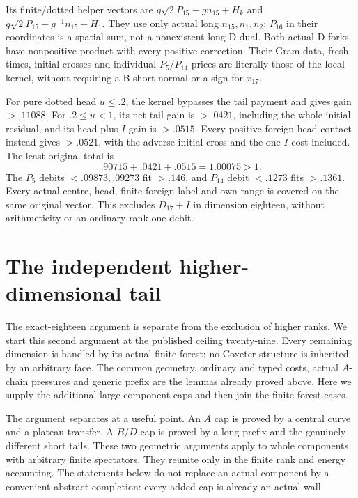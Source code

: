 \documentclass[11pt]{article}
\theoremstyle{definition}
\theoremstyle{remark}
\begin{document}
Its finite/dotted helper vectors are
\(g\sqrt2P_{15}-gn_{15}+H_k\) and
\(g\sqrt2P_{15}-g^{-1}n_{15}+H_1\). They use only actual long
\(n_{15},n_1,n_2\); \(P_{16}\) in their coordinates is a spatial
sum, not a nonexistent long D dual. Both actual D forks have
nonpositive product with every positive correction. Their Gram data,
fresh times, initial crosses and individual \(P_5/P_{14}\) prices
are literally those of the local kernel, without requiring a B short
normal or a sign for \(x_{17}\).

For pure dotted head \(u\le.2\), the kernel bypasses the tail payment
and gives gain \(>.11088\). For \(.2\le u<1\), its net tail gain
is \(>.0421\), including the whole initial residual, and its
head-plus-\(I\) gain is \(>.0515\). Every positive foreign head
contact instead gives \(>.0521\), with the adverse initial cross
and the one \(I\) cost included. The least original total is
\[
                   .90715+.0421+.0515=1.00075>1.
\]
The \(P_5\) debits \(<.09873,.09273\) fit \(>.146\), and
\(P_{14}\) debit \(<.1273\) fits \(>.1361\). Every actual centre,
head, finite foreign label and own range is covered on the same
original vector. This excludes \(D_{17}+I\) in dimension eighteen,
without arithmeticity or an ordinary rank-one debit.

\section{The independent higher-dimensional tail}
\label{app:highertail}
The exact-eighteen argument is separate from the exclusion of higher
ranks. We start this second argument at the published ceiling twenty-nine.
Every remaining dimension is handled by its actual finite forest; no
Coxeter structure is inherited by an arbitrary face. The common geometry,
ordinary and typed costs, actual $A$-chain pressures and generic prefix
are the lemmas already proved above. Here we supply the additional
large-component caps and then join the finite forest cases.

The argument separates at a useful point. An $A$ cap is proved by a
central curve and a plateau transfer. A $B/D$ cap is proved by a long
prefix and the genuinely different short tails. These two geometric
arguments apply to whole components with arbitrary finite spectators.
They reunite only in the finite rank and energy accounting. The
statements below do not replace an actual component by a convenient
abstract completion: every added cap is already an actual wall.
\end{document}
